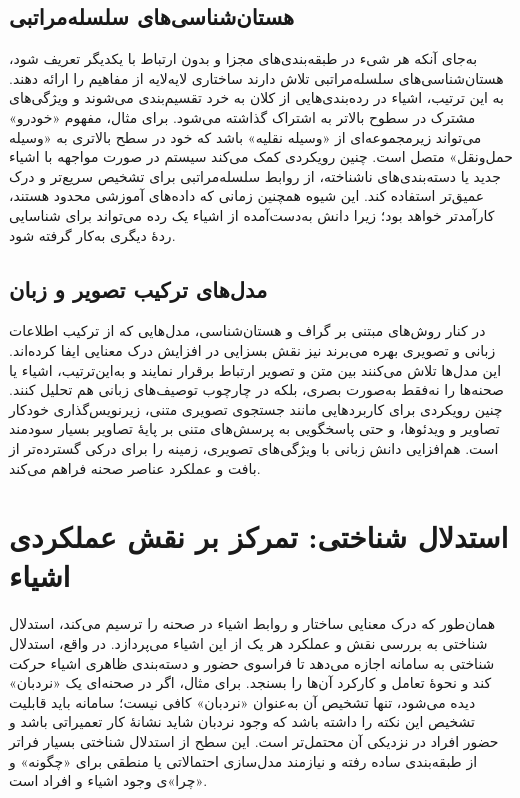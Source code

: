 \subsection*{هستان‌شناسی‌های سلسله‌مراتبی}
به‌جای آنکه هر شیء در طبقه‌بندی‌های مجزا و بدون ارتباط با یکدیگر تعریف شود، هستان‌شناسی‌های سلسله‌مراتبی تلاش دارند ساختاری لایه‌لایه از مفاهیم را ارائه دهند. به این ترتیب، اشیاء در رده‌بندی‌هایی از کلان به خرد تقسیم‌بندی می‌شوند و ویژگی‌های مشترک در سطوح بالاتر به اشتراک گذاشته می‌شود. برای مثال، مفهوم «خودرو» می‌تواند زیرمجموعه‌ای از «وسیله نقلیه» باشد که خود در سطح بالاتری به «وسیله حمل‌ونقل» متصل است. چنین رویکردی کمک می‌کند سیستم در صورت مواجهه با اشیاء جدید یا دسته‌بندی‌های ناشناخته، از روابط سلسله‌مراتبی برای تشخیص سریع‌تر و درک عمیق‌تر استفاده کند. این شیوه همچنین زمانی که داده‌های آموزشی محدود هستند، کارآمدتر خواهد بود؛ زیرا دانش به‌دست‌آمده از اشیاء یک رده می‌تواند برای شناسایی ردهٔ دیگری به‌کار گرفته شود.

\subsection*{مدل‌های ترکیب تصویر و زبان}
در کنار روش‌های مبتنی بر گراف و هستان‌شناسی، مدل‌هایی که از ترکیب اطلاعات زبانی و تصویری بهره می‌برند نیز نقش بسزایی در افزایش درک معنایی ایفا کرده‌اند. این مدل‌ها تلاش می‌کنند بین متن و تصویر ارتباط برقرار نمایند و به‌این‌ترتیب، اشیاء یا صحنه‌ها را نه‌فقط به‌صورت بصری، بلکه در چارچوب توصیف‌های زبانی هم تحلیل کنند. چنین رویکردی برای کاربردهایی مانند جستجوی تصویری متنی، زیرنویس‌گذاری خودکار تصاویر و ویدئوها، و حتی پاسخگویی به پرسش‌های متنی بر پایهٔ تصاویر بسیار سودمند است. هم‌افزایی دانش زبانی با ویژگی‌های تصویری، زمینه را برای درکی گسترده‌تر از بافت و عملکرد عناصر صحنه فراهم می‌کند.

\section*{استدلال شناختی: تمرکز بر نقش عملکردی اشیاء}
همان‌طور که درک معنایی ساختار و روابط اشیاء در صحنه را ترسیم می‌کند، استدلال شناختی به بررسی نقش و عملکرد هر یک از این اشیاء می‌پردازد. در واقع، استدلال شناختی به سامانه اجازه می‌دهد تا فراسوی حضور و دسته‌بندی ظاهری اشیاء حرکت کند و نحوهٔ تعامل و کارکرد آن‌ها را بسنجد. برای مثال، اگر در صحنه‌ای یک «نردبان» دیده می‌شود، تنها تشخیص آن به‌عنوان «نردبان» کافی نیست؛ سامانه باید قابلیت تشخیص این نکته را داشته باشد که وجود نردبان شاید نشانهٔ کار تعمیراتی باشد و حضور افراد در نزدیکی آن محتمل‌تر است. این سطح از استدلال شناختی بسیار فراتر از طبقه‌بندی ساده رفته و نیازمند مدل‌سازی احتمالاتی یا منطقی برای «چگونه» و «چرا»ی وجود اشیاء و افراد است.

